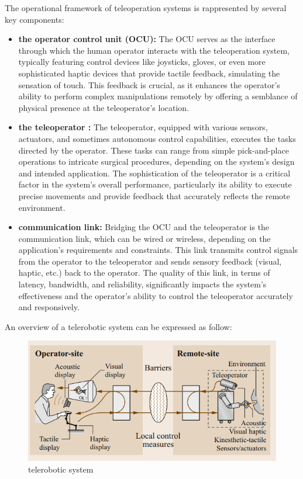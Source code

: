 The operational framework of teleoperation systems is rappresented by several key components: 
\begin{itemize}
    \item\textbf{the operator control unit (OCU):} The OCU serves as the interface through which the human operator interacts with the teleoperation system, typically featuring control devices like joysticks, gloves, or even more sophisticated haptic devices that provide tactile feedback, simulating the sensation of touch. This feedback is crucial, as it enhances the operator's ability to perform complex manipulations remotely by offering a semblance of physical presence at the teleoperator's location.
    
    \item\textbf{the teleoperator :} The teleoperator, equipped with various sensors, actuators, and sometimes autonomous control capabilities, executes the tasks directed by the operator. These tasks can range from simple pick-and-place operations to intricate surgical procedures, depending on the system’s design and intended application. The sophistication of the teleoperator is a critical factor in the system’s overall performance, particularly its ability to execute precise movements and provide feedback that accurately reflects the remote environment.
    
    \item\textbf{communication link:} Bridging the OCU and the teleoperator is the communication link, which can be wired or wireless, depending on the application's requirements and constraints. This link transmits control signals from the operator to the teleoperator and sends sensory feedback (visual, haptic, etc.) back to the operator. The quality of this link, in terms of latency, bandwidth, and reliability, significantly impacts the system's effectiveness and the operator's ability to control the teleoperator accurately and responsively.

\end{itemize}

An overview of a telerobotic system can be expressed as follow:
\begin{figure}[th]
    \centering
    \includegraphics[scale=0.6]{Figures/Chapter2/teleoperation.png}
    \caption[telerobotic system]{telerobotic system}
    \label{fig:telerobotic system}
\end{figure}


